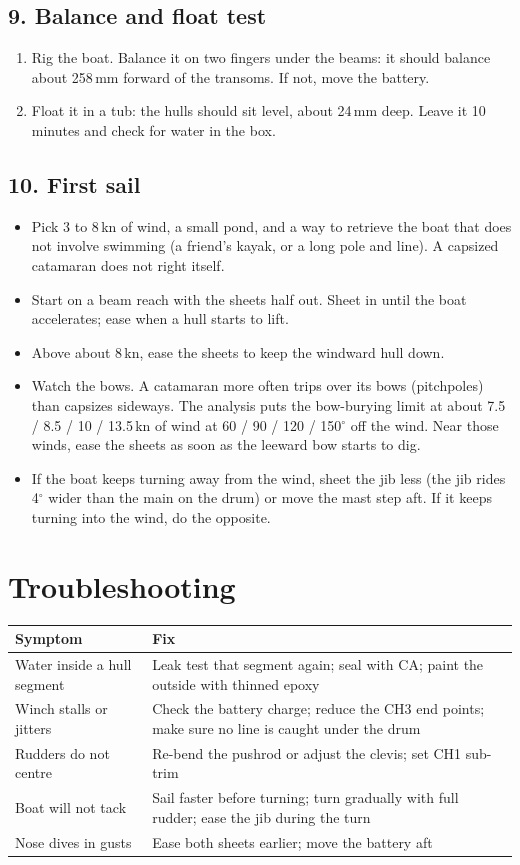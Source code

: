 \documentclass[11pt]{article}
\newcommand{\step}[1]{\subsection*{\color{accent}#1}}
\begin{document}
\step{9. Balance and float test}
\begin{enumerate}
\item Rig the boat. Balance it on two fingers under the beams: it should balance about 258\,mm forward of the transoms. If not, move the battery.
\item Float it in a tub: the hulls should sit level, about 24\,mm deep. Leave it 10 minutes and check for water in the box.
\end{enumerate}

\step{10. First sail}
\begin{itemize}
\item Pick 3 to 8\,kn of wind, a small pond, and a way to retrieve the boat that does not involve swimming (a friend's kayak, or a long pole and line). A capsized catamaran does not right itself.
\item Start on a beam reach with the sheets half out. Sheet in until the boat accelerates; ease when a hull starts to lift.
\item Above about 8\,kn, ease the sheets to keep the windward hull down.
\item Watch the bows. A catamaran more often trips over its bows (pitchpoles) than capsizes sideways. The analysis puts the bow-burying limit at about 7.5 / 8.5 / 10 / 13.5\,kn of wind at 60 / 90 / 120 / 150$^\circ$ off the wind. Near those winds, ease the sheets as soon as the leeward bow starts to dig.
\item If the boat keeps turning away from the wind, sheet the jib less (the jib rides 4$^\circ$ wider than the main on the drum) or move the mast step aft. If it keeps turning into the wind, do the opposite.
\end{itemize}

\section{Troubleshooting}
\begin{tabularx}{\textwidth}{>{\raggedright}p{4cm}X}
\toprule
Symptom & Fix \\
\midrule
Water inside a hull segment & Leak test that segment again; seal with CA; paint the outside with thinned epoxy \\
Winch stalls or jitters & Check the battery charge; reduce the CH3 end points; make sure no line is caught under the drum \\
Rudders do not centre & Re-bend the pushrod or adjust the clevis; set CH1 sub-trim \\
Boat will not tack & Sail faster before turning; turn gradually with full rudder; ease the jib during the turn \\
Nose dives in gusts & Ease both sheets earlier; move the battery aft \\
\bottomrule
\end{tabularx}
\end{document}
